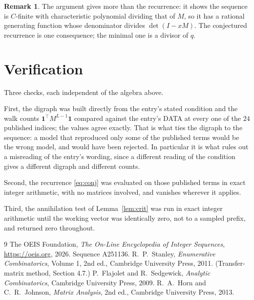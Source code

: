 \documentclass[11pt,a4paper]{article}
\theoremstyle{plain}
\theoremstyle{definition}
\newtheorem{remark}[theorem]{Remark}
\begin{document}
\begin{remark}
The argument gives more than the recurrence: it shows the sequence is $C$-finite with
characteristic polynomial dividing that of $M$, so it has a rational generating function
whose denominator divides $\det(I-xM)$. The conjectured recurrence is one consequence; the
minimal one is a divisor of $q$.
\end{remark}

\section{Verification}

Three checks, each independent of the algebra above.

First, the digraph was built directly from the entry's stated condition and the walk counts
$\mathbf{1}^{\!\top}M^{L-1}\mathbf{1}$ compared against the entry's DATA at
every one of the $24$ published indices; the values agree exactly. That is what ties
the digraph to the sequence: a model that reproduced only some of the published terms would
be the wrong model, and would have been rejected. In particular it is what rules out a
misreading of the entry's wording, since a different reading of the condition gives a
different digraph and different counts.

Second, the recurrence \eqref{eq:conj} was evaluated on those published terms in exact
integer arithmetic, with no matrices involved, and vanishes wherever it applies.

Third, the annihilation test of Lemma~\ref{lem:crit} was run in exact integer arithmetic
until the working vector was identically zero, not to a sampled prefix, and returned zero
throughout.

\begin{thebibliography}{9}
 The OEIS Foundation, \emph{The On-Line Encyclopedia of Integer
Sequences}, \url{https://oeis.org}, 2026. Sequence A251136.
 R.~P.~Stanley, \emph{Enumerative Combinatorics}, Volume 1, 2nd ed.,
Cambridge University Press, 2011. (Transfer-matrix method, Section 4.7.)
 P.~Flajolet and R.~Sedgewick, \emph{Analytic Combinatorics}, Cambridge
University Press, 2009.
 R.~A.~Horn and C.~R.~Johnson, \emph{Matrix Analysis}, 2nd ed., Cambridge
University Press, 2013.
\end{thebibliography}
\end{document}
